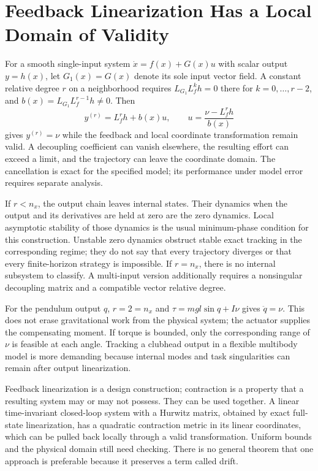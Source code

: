 \section{Feedback Linearization Has a Local Domain of Validity}

For a smooth single-input system $\dot x=f(x)+G(x)u$ with scalar output $y=h(x)$, let $G_1(x)=G(x)$ denote its sole input vector field. A constant relative degree $r$ on a neighborhood requires $L_{G_1}L_f^kh=0$ there for $k=0,\ldots,r-2$, and $b(x)=L_{G_1}L_f^{r-1}h\ne0$. Then
\begin{equation}
y^{(r)}=L_f^rh+b(x)u,\qquad
u=\frac{\nu-L_f^rh}{b(x)}
\label{eq:ch3:linearizing-feedback}
\end{equation}
gives $y^{(r)}=\nu$ while the feedback and local coordinate transformation remain valid. A decoupling coefficient can vanish elsewhere, the resulting effort can exceed a limit, and the trajectory can leave the coordinate domain. The cancellation is exact for the specified model; its performance under model error requires separate analysis.

If $r<n_x$, the output chain leaves internal states. Their dynamics when the output and its derivatives are held at zero are the zero dynamics. Local asymptotic stability of those dynamics is the usual minimum-phase condition for this construction. Unstable zero dynamics obstruct stable exact tracking in the corresponding regime; they do not say that every trajectory diverges or that every finite-horizon strategy is impossible. If $r=n_x$, there is no internal subsystem to classify. A multi-input version additionally requires a nonsingular decoupling matrix and a compatible vector relative degree.

For the pendulum output $q$, $r=2=n_x$ and $\tau=mgl\sin q+I\nu$ gives $\ddot q=\nu$. This does not erase gravitational work from the physical system; the actuator supplies the compensating moment. If torque is bounded, only the corresponding range of $\nu$ is feasible at each angle. Tracking a clubhead output in a flexible multibody model is more demanding because internal modes and task singularities can remain after output linearization.

Feedback linearization is a design construction; contraction is a property that a resulting system may or may not possess. They can be used together. A linear time-invariant closed-loop system with a Hurwitz matrix, obtained by exact full-state linearization, has a quadratic contraction metric in its linear coordinates, which can be pulled back locally through a valid transformation. Uniform bounds and the physical domain still need checking. There is no general theorem that one approach is preferable because it preserves a term called drift.

